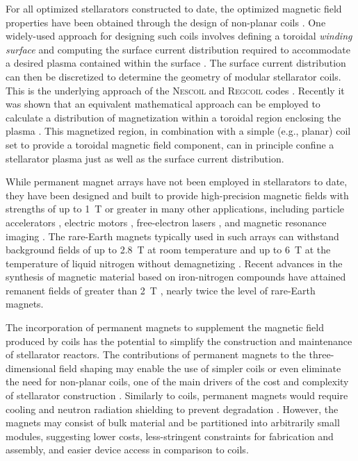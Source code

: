 \documentclass[11pt,onecolumn]{article}
\begin{document}
For all optimized stellarators constructed to date, the optimized magnetic
field properties have been obtained through the design of non-planar 
coils \cite{beidler1990a,sapper1990a,anderson1995a}.
One widely-used approach for designing such coils involves defining
a toroidal \textit{winding surface} and computing the surface current 
distribution required to accommodate a desired plasma contained within the
surface \cite{merkel1987a}. The surface current distribution can then be
discretized to determine the geometry of modular stellarator coils. This is the 
underlying approach of the \textsc{Nescoil} and \textsc{Regcoil} codes 
\cite{landreman2017a}.
Recently it was shown that an equivalent mathematical approach can be employed
to calculate a distribution of magnetization within a toroidal region
enclosing the plasma \cite{helander2020a}. This magnetized region, in 
combination with
a simple (e.g., planar) coil set to provide a toroidal magnetic field component,
can in principle confine a stellarator plasma just as well as the surface
current distribution. 

While permanent magnet arrays have not been employed in stellarators to date,
they have been designed and built to provide high-precision magnetic fields
with strengths of up to 1~T or greater in many other applications, including
particle accelerators \cite{aleksandrov2014a, thonet2016a, hoffstaetter2017a}, 
electric motors \cite{zhu2001a},
free-electron lasers \cite{roberson1989a, oshea2010a}, and magnetic resonance 
imaging \cite{bluemlich2008a}. The rare-Earth magnets typically used in
such arrays can withstand background fields of up to 2.8~T at room temperature
and up to 6~T at the temperature of liquid nitrogen without 
demagnetizing \cite{benabderrahmane2012a}. Recent advances in the synthesis of
magnetic material based on iron-nitrogen compounds have attained remanent
fields of greater than 2~T \cite{wang2012a,jiang2016a}, nearly twice the level 
of rare-Earth magnets.

The incorporation of permanent magnets to supplement the magnetic field produced
by coils has the potential to simplify the construction and 
maintenance of stellarator reactors. The contributions of permanent magnets
to the three-dimensional field shaping may enable the use of simpler
coils or even eliminate the need for non-planar coils, one
of the main drivers of the cost and complexity of stellarator construction
\cite{nielson2010a,rummel2012a,bosch2013a}.
Similarly to coils, permanent magnets would require cooling and neutron
radiation shielding to prevent degradation \cite{alderman2002a}. However,
the magnets may consist of bulk material and be partitioned
into arbitrarily small modules, suggesting lower costs, less-stringent
constraints for fabrication and assembly, and easier device access 
in comparison to coils. 
\end{document}
